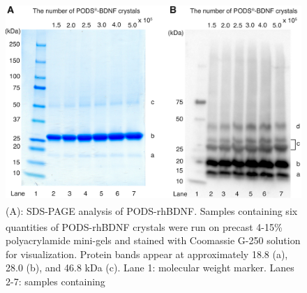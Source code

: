 \documentclass[review]{elsarticle}
\begin{document}
\begin{figure}
	\begin{center}
		\includegraphics[width=13cm]{Fig_6.jpg}
	\end{center}
	\caption{(A): SDS-PAGE analysis of PODS\textsuperscript{\textregistered}-rhBDNF. Samples containing six quantities of PODS\textsuperscript{\textregistered}-rhBDNF crystals were run on precast 4-15\% polyacrylamide mini-gels and stained with Coomassie G-250 solution for visualization. Protein bands appear at approximately 18.8 (a), 28.0 (b), and 46.8 kDa (c). Lane 1: molecular weight marker. Lanes 2-7: samples containing   }
\end{figure}
\end{document}
